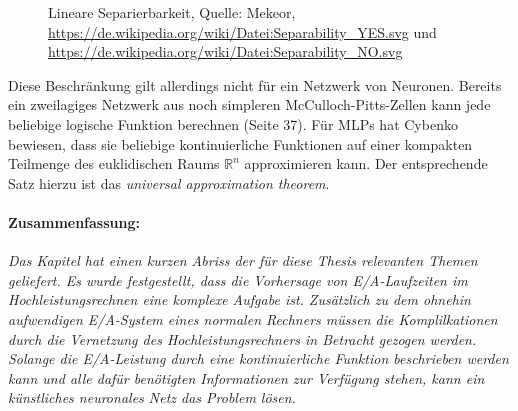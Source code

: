 \documentclass[
	12pt,
	a4paper,
	BCOR10mm,
	DIV14,
	listof=totoc,
	bibliography=totoc,
	headsepline
]{scrreprt}
\begin{document}
\begin{figure}
	\hfill
	\caption{Lineare Separierbarkeit, Quelle: Mekeor, \url{https://de.wikipedia.org/wiki/Datei:Separability_YES.svg} und \url{https://de.wikipedia.org/wiki/Datei:Separability_NO.svg}}
	\label{fig:separierbarkeit}
\end{figure} 

Diese Beschränkung gilt allerdings nicht für ein Netzwerk von Neuronen. Bereits ein zweilagiges Netzwerk aus noch simpleren McCulloch-Pitts-Zellen kann jede beliebige logische Funktion berechnen \cite{Rojas:1996:NNS:235222} (Seite 37).
Für MLPs hat Cybenko \cite{cybenko:mcss} bewiesen, dass sie beliebige kontinuierliche Funktionen auf einer kompakten Teilmenge des euklidischen Raums $\mathbb{R}^n$ approximieren kann. Der entsprechende Satz hierzu ist das \textit{universal approximation theorem}.

\bigskip
\paragraph{Zusammenfassung:}
\textit{ 
	Das Kapitel hat einen kurzen Abriss der für diese Thesis relevanten Themen geliefert. Es wurde festgestellt, dass die Vorhersage von E/A-Laufzeiten im Hochleistungsrechnen eine komplexe Aufgabe ist. Zusätzlich zu dem ohnehin aufwendigen E/A-System eines normalen Rechners müssen die Komplilkationen durch die Vernetzung des Hochleistungsrechners in Betracht gezogen werden.
	Solange die E/A-Leistung durch eine kontinuierliche Funktion beschrieben werden kann und alle dafür benötigten Informationen zur Verfügung stehen, kann ein künstliches neuronales Netz das Problem lösen.
}
\end{document}
